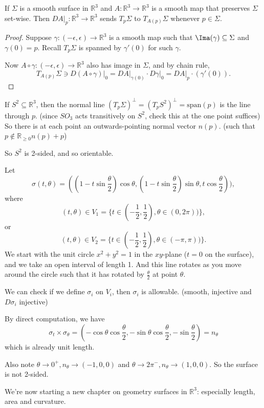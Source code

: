 \begin{lemma}
    If \(\Sigma\) is a smooth surface in \(\mathbb{R}^3\) and \(A: \mathbb{R}^3 \to \mathbb{R}^3\) is a smooth map that preserves \(\Sigma\) set-wise. Then
    \(\left.DA\right|_p:\mathbb{R}^3 \to \mathbb{R}^3\) sends \(T_p\Sigma\) to \(T_{A(p)}\Sigma\) whenever \(p \in \Sigma\).
\end{lemma}
\begin{proof}
    Suppose \(\gamma:(-\epsilon, \epsilon)\to \mathbb{R}^3\) is a smooth map such that \(\Ima(\gamma)\subseteq \Sigma\) and \(\gamma(0)=p\). Recall \(T_p\Sigma\) is spanned by \(\gamma'(0)\) for such \(\gamma\).

    Now \(A \circ \gamma: (-\epsilon,\epsilon) \to \mathbb{R}^3\) also has image in \(\Sigma\), and by chain rule,
    \[
        T_{A(p)}\Sigma \ni \left.D(A\circ \gamma)\right|_0 = \left.DA\right|_{\gamma(0)}\cdot \left.D\gamma\right|_0 = \left.DA\right|_p\cdot(\gamma'(0)).
    \]
\end{proof}
\begin{example}
    If \(S^2 \subseteq \mathbb{R}^3\), then the normal line \((T_p\Sigma)^\perp = (T_p S^2)^\perp = \mathrm{span}(p)\) is the line through \(p\). (since \(SO_3\) acts transitively on \(S^2\), check this at the one point suffices) So there is at each point an outwards-pointing normal vector \(n(p)\). (such that \(p \notin \mathbb{R}_{\geq 0}n(p) + p\))

    So \(S^2\) is 2-sided, and so orientable.
\end{example}
\begin{example}
    Let
    \[\sigma(t, \theta) = ((1 - t\sin \frac{\theta}{2})\cos \theta, (1 - t\sin \frac{\theta}{2})\sin \theta,t\cos \frac{\theta}{2})),\]
    where
    \[
        (t,\theta) \in V_1 = \{t \in (-\frac{1}{2},\frac{1}{2}), \theta \in (0, 2\pi))\},
    \]
    or
    \[
        (t,\theta) \in V_2 = \{t \in (-\frac{1}{2},\frac{1}{2}), \theta \in (-\pi, \pi))\}.
    \]
    We start with the unit circle \(x^2 + y^2 = 1\) in the \(xy\)-plane (\(t=0\) on the surface), and we take an open interval of length 1. And this line rotates as you move around the circle such that it has rotated by \(\frac{\theta}{2}\) at point \(\theta\).

    We can check if we define \(\sigma_i\) on \(V_i\), then \(\sigma_i\) is allowable. (smooth, injective and \(D\sigma_i\) injective)

    By direct computation, we have
    \[
        \sigma_t \times \sigma_\theta = (-\cos \theta \cos \frac{\theta}{2}, - \sin \theta \cos \frac{\theta}{2}, -\sin \frac{\theta}{2}) = n_\theta
    \]
    which is already unit length.

    Also note \(\theta \to 0^+, n_\theta \to (-1,0,0)\) and \(\theta \to 2\pi^-, n_\theta \to (1,0,0)\). So the surface is not 2-sided.
\end{example}
We're now starting a new chapter on geometry surfaces in \(\mathbb{R}^3\): especially length, area and curvature.

